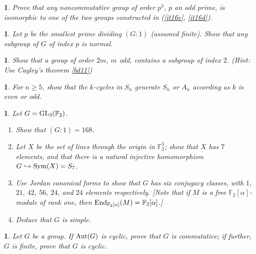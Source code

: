 \documentclass[a4paper,11pt,final]{memoir}%
\newtheorem{exercise}[Y]{}
\theoremstyle{nonumberplain}
\begin{document}
\begin{exercise}
\label{x21} Prove that any noncommutative group of order $p^{3}$, $p$ an odd
prime, is isomorphic to one of the two groups constructed in (\ref{it16e},
\ref{it16d}).

\end{exercise}

\begin{exercise}
\label{x22} Let $p$ be the smallest prime dividing $(G:1)$ (assumed finite).
Show that any subgroup of $G$ of index $p$ is normal.

\end{exercise}

\begin{exercise}
\label{x23} Show that a group of order $2m$, $m$ odd, contains a subgroup of
index $2$. (Hint: Use Cayley's theorem \ref{bd11})

\end{exercise}

\begin{exercise}
\label{x23a}For $n\geq5$, show that the $k$-cycles in $S_{n}$ generate $S_{n}$
or $A_{n}$ according as $k$ is even or odd.

\end{exercise}

\begin{exercise}
\label{x24} Let $G=\operatorname{GL}_{3}(\mathbb{F}_{2})$.

\begin{enumerate}
\item Show that $(G:1)=168$.

\item Let $X$ be the set of lines through the origin in $\mathbb{F}_{2}^{3}$;
show that $X$ has $7$ elements, and that there is a natural injective
homomorphism $G\hookrightarrow\operatorname{Sym}(X)=S_{7}$.

\item Use Jordan canonical forms to show that $G$ has six conjugacy classes,
with $1$, $21$, $42$, $56$, $24$, and $24$ elements respectively. [Note that
if $M$ is a free $\mathbb{F}_{2}[\alpha]$-module of rank one, then
$\operatorname{End}_{\mathbb{F}_{2}[\alpha]}(M)=\mathbb{F}_{2}[\alpha]$.]

\item Deduce that $G$ is simple.
\end{enumerate}

\end{exercise}

\begin{exercise}
\label{x25} Let $G$ be a group. If $\operatorname{Aut}(G)$ is cyclic, prove that $G$ is
commutative; if further, $G$ is finite, prove that $G$ is cyclic.
\end{exercise}
\end{document}
